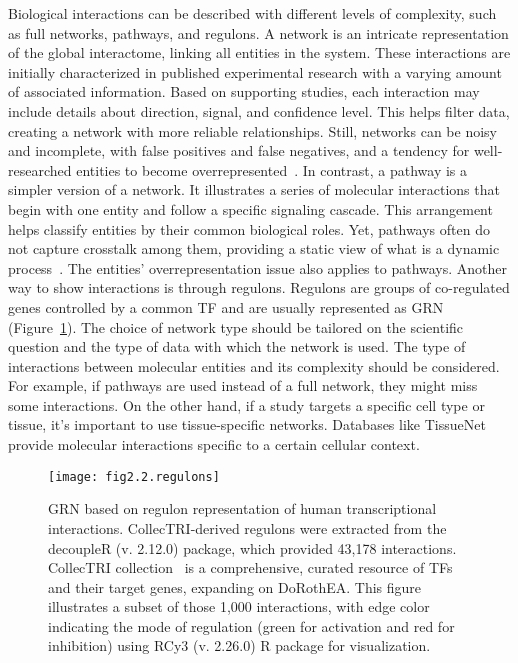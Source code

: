 Biological interactions can be described with different levels of complexity, such as full networks, pathways, and regulons. A network is an intricate representation of the global interactome, linking all entities in the system. These interactions are initially characterized in published experimental research with a varying amount of associated information. Based on supporting studies, each interaction may include details about direction, signal, and confidence level. This helps filter data, creating a network with more reliable relationships. 
Still, networks can be noisy and incomplete, with false positives and false negatives, and a tendency for well-researched entities to become overrepresented~\cite{RN131, RN38, RN136}. In contrast, a pathway is a simpler version of a network. It illustrates a series of molecular interactions that begin with one entity and follow a specific signaling cascade. This arrangement helps classify entities by their common biological roles. 
Yet, pathways often do not capture crosstalk among them, providing a static view of what is a dynamic process~\cite{RN38}. The entities' overrepresentation issue also applies to pathways. Another way to show interactions is through regulons. 
Regulons are groups of co-regulated genes controlled by a common \gls{TF} and are usually represented as \gls{GRN} (Figure~\ref{fig:fig2.2.regulons}). The choice of network type should be tailored on the scientific question and the type of data with which the network is used.
The type of interactions between molecular entities and its complexity should be considered. For example, if pathways are used instead of a full network, they might miss some interactions. On the other hand, if a study targets a specific cell type or tissue, it's important to use tissue-specific networks. Databases like TissueNet~\cite{RN137} provide molecular interactions specific to a certain cellular context. 

\begin{figure}[htbp]
    \centering
    \texttt{[image: fig2.2.regulons]}
    \caption[Gene regulatory network based on regulon representation of human transcriptional interactions.]{\gls{GRN} based on regulon representation of human transcriptional interactions. CollecTRI-derived regulons were extracted from the decoupleR (v. 2.12.0) package, which provided 43,178 interactions. CollecTRI collection~\cite{RN145} is a comprehensive, curated resource of \gls{TF}s and their target genes, expanding on DoRothEA. This figure illustrates a subset of those 1,000 interactions, with edge color indicating the mode of regulation (green for activation and red for inhibition) using RCy3 (v. 2.26.0) \gls{R} package for visualization.}
    \label{fig:fig2.2.regulons}
\end{figure}

